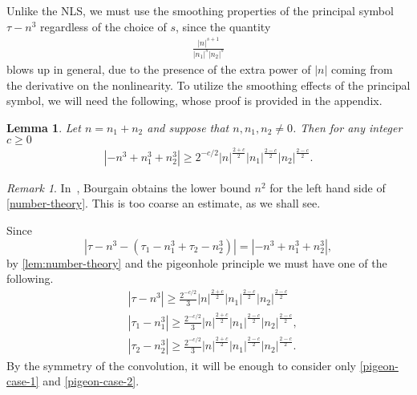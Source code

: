 \documentclass[12pt,reqno]{amsart}
\numberwithin{equation}{section}  %
\numberwithin{figure}{section}
\theoremstyle{plain}
\newtheorem{lemma}{Lemma}
\theoremstyle{definition}
\theoremstyle{remark}
\newtheorem{remark}{Remark}
\begin{document}
%
%
Unlike the NLS, we must use the smoothing properties of the
principal symbol $\tau - n^3$ regardless of the choice of $s$, since the quantity
%
%
\begin{equation}
	\label{convo-multiplier}
	\begin{split}
		\frac{|n|^{s+1}}{|n_1|^s |n_2|^s }
	\end{split}
\end{equation}
%
%
blows up in general, due to the presence of the extra power of $|n|$ coming from the derivative on
the nonlinearity. To utilize the smoothing effects of the principal symbol, we will need the following, whose
proof is provided in the appendix.
%
%
\begin{lemma}
	\label{lem:number-theory}
	Let $n=n_1 + n_2$ and suppose that $n, n_1, n_2\neq
	0$. Then for any integer $c \ge 0$
%
%
\begin{equation}
	\begin{split}
		\label{number-theory}
		| - n^{3} + n_1^3 + n_2^3| \ge 2^{-c/2} | n |^{\frac{2+c}{2}} | n_{1}
		|^{\frac{2-c}{2}}| n_2 |^{\frac{2-c}{2}}.
	\end{split}
\end{equation}
%
%
\end{lemma}
%
%
\begin{remark}
	In~\cite{Bourgain-Fourier-transfo}, Bourgain obtains the lower bound $n^2$ for
	the left hand side of \eqref{number-theory}. This is too coarse an estimate,
	as we shall see.
\end{remark}
%
%
Since $$| \tau - n^{3} - \left( \tau_1 - n_1^3 
+ \tau_2 - n_2^3  \right ) | = | - n^{3} + n_1^3 +
n_2^3|,$$ by \autoref{lem:number-theory} and
the pigeonhole principle we must have one of the 
following.
%
%
\begin{align}
	\label{pigeon-case-1}
	& |\tau - n^3| \ge \frac{2^{-c/2}}{3} | n |^{\frac{2+c}{2}} | n_{1}
		|^{\frac{2-c}{2}}| n_2 |^{\frac{2-c}{2}}		\\
		\label{pigeon-case-2}
		& | \tau_1 - n_1^3 | \ge \frac{2^{-c/2}}{3} | n |^{\frac{2+c}{2}} | n_{1}
		|^{\frac{2-c}{2}}| n_2 |^{\frac{2-c}{2}},  
		\\
		\label{pigeon-case-3}
		& | \tau_2 - n_2^3 | \ge
		\frac{2^{-c/2}}{3} | n |^{\frac{2+c}{2}} | n_{1}
		|^{\frac{2-c}{2}}| n_2 |^{\frac{2-c}{2}}.  
\end{align}
%
%
By the symmetry of the convolution, it will be enough to consider only
\eqref{pigeon-case-1} and \eqref{pigeon-case-2}.
%
%
%
\end{document}
